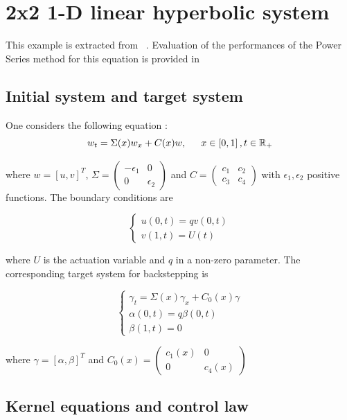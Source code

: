\documentclass[11pt,a4paper]{article}
\newcommand{\R}{\mathbb{R}}
\begin{document}
\section{ 2x2 1-D linear hyperbolic system}

This example is extracted from ~\cite{coron-vazquez}. Evaluation of the performances of the Power Series method for this equation is provided in ~\cite{vazquez-chen-qiao-krstic}

\subsection{Initial system and target system}

One considers the following equation : 
$$w_t = \Sigma(x)w_x + C(x)w, \text{\hspace{1.5em}} x \in \left[0,1\right], t \in \R_+$$

where $w = \left[u,v\right]^T$, $\Sigma = \begin{pmatrix}
  -\epsilon_1 & 0 \\
  0 & \epsilon_2
\end{pmatrix}$ and $C = \begin{pmatrix}
  c_1 & c_2 \\
  c_3 & c_4
\end{pmatrix}$ with $\epsilon_1, \epsilon_2$ positive functions. The boundary conditions are

$$\begin{cases}
  u(0,t) = qv(0,t) \\
  v(1,t) = U(t)
\end{cases}$$

where $U$ is the actuation variable and $q$ in a non-zero parameter. The corresponding target system for backstepping is 

$$\begin{cases}
  \gamma_t = \Sigma(x) \gamma_x + C_0(x) \gamma\\
  \alpha(0,t) = q\beta(0,t) \\
  \beta(1,t) = 0
\end{cases}$$

where $\gamma = \left[\alpha, \beta\right]^T$ and $C_0(x) = \begin{pmatrix} c_1(x) & 0 \\ 0 & c_4(x) \end{pmatrix}$

\subsection{Kernel equations and control law}
\end{document}
